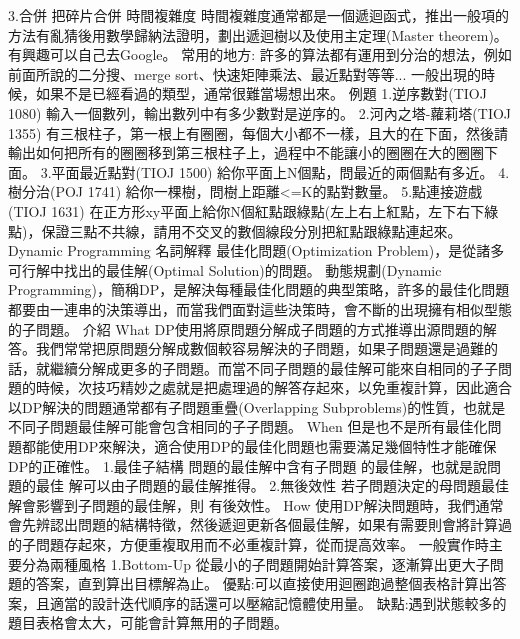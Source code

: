 \documentclass{article}
\begin{document}
            3.合併 把碎片合併
        時間複雜度
            時間複雜度通常都是一個遞迴函式，推出一般項的方法有亂猜後用數學歸納法證明，劃出遞迴樹以及使用主定理(Master theorem)。有興趣可以自己去Google。
        常用的地方:
            許多的算法都有運用到分治的想法，例如前面所說的二分搜、merge sort、快速矩陣乘法、最近點對等等...
            一般出現的時候，如果不是已經看過的類型，通常很難當場想出來。
    例題
        1.逆序數對(TIOJ 1080)
            輸入一個數列，輸出數列中有多少數對是逆序的。
        2.河內之塔-蘿莉塔(TIOJ 1355)
            有三根柱子，第一根上有圈圈，每個大小都不一樣，且大的在下面，然後請輸出如何把所有的圈圈移到第三根柱子上，過程中不能讓小的圈圈在大的圈圈下面。
        3.平面最近點對(TIOJ 1500)
            給你平面上N個點，問最近的兩個點有多近。
        4.樹分治(POJ 1741)
            給你一棵樹，問樹上距離<=K的點對數量。
        5.點連接遊戲(TIOJ 1631)
            在正方形xy平面上給你N個紅點跟綠點(左上右上紅點，左下右下綠點)，保證三點不共線，請用不交叉的數個線段分別把紅點跟綠點連起來。
Dynamic Programming
    名詞解釋
        最佳化問題(Optimization Problem)，是從諸多可行解中找出的最佳解(Optimal Solution)的問題。 
        動態規劃(Dynamic Programming)，簡稱DP，是解決每種最佳化問題的典型策略，許多的最佳化問題都要由一連串的決策導出，而當我們面對這些決策時，會不斷的出現擁有相似型態的子問題。
    介紹
        What
            DP使用將原問題分解成子問題的方式推導出源問題的解答。我們常常把原問題分解成數個較容易解決的子問題，如果子問題還是過難的話，就繼續分解成更多的子問題。而當不同子問題的最佳解可能來自相同的子子問題的時候，次技巧精妙之處就是把處理過的解答存起來，以免重複計算，因此適合以DP解決的問題通常都有子問題重疊(Overlapping Subproblems)的性質，也就是不同子問題最佳解可能會包含相同的子子問題。
        When
            但是也不是所有最佳化問題都能使用DP來解決，適合使用DP的最佳化問題也需要滿足幾個特性才能確保DP的正確性。
                1.最佳子結構
                    問題的最佳解中含有子問題 的最佳解，也就是說問題的最佳 解可以由子問題的最佳解推得。
                2.無後效性
                    若子問題決定的母問題最佳 解會影響到子問題的最佳解，則 有後效性。
        How
            使用DP解決問題時，我們通常會先辨認出問題的結構特徵，然後遞迴更新各個最佳解，如果有需要則會將計算過的子問題存起來，方便重複取用而不必重複計算，從而提高效率。 
            一般實作時主要分為兩種風格
                1.Bottom-Up
                    從最小的子問題開始計算答案，逐漸算出更大子問題的答案，直到算出目標解為止。 
                    優點:可以直接使用迴圈跑過整個表格計算出答案，且適當的設計迭代順序的話還可以壓縮記憶體使用量。 
                    缺點:遇到狀態較多的題目表格會太大，可能會計算無用的子問題。
\end{document}

